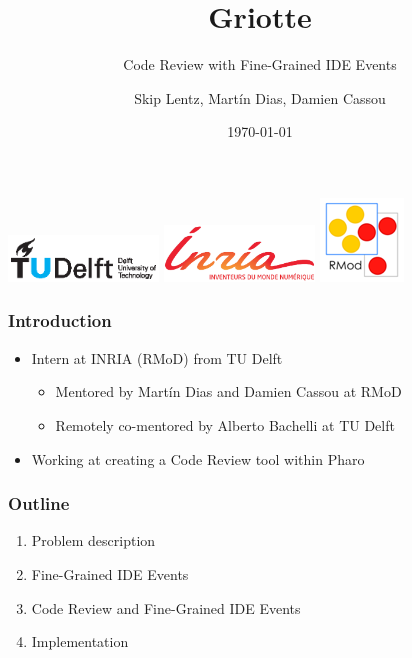 \documentclass[aspectratio=169]{beamer}
\title{Griotte}
\subtitle{Code Review with Fine-Grained IDE Events}
\author{Skip Lentz, Martín Dias, Damien Cassou}
\institute{TU Delft, INRIA Lille - Nord Europe}
\date{\today}
\begin{document}
\begin{frame}

\titlepage
\centering
\includegraphics[width=40mm]{img/tu_delft_logo.eps}
\includegraphics[width=40mm]{img/inria_logo.eps}
\includegraphics{img/rmod_logo.png}

\end{frame}

\begin{frame}[fragile]

\frametitle{Introduction}

\begin{itemize}
\item Intern at INRIA (RMoD) from TU Delft
\begin{itemize}
\item Mentored by Martín Dias and Damien Cassou at RMoD
\item Remotely co-mentored by Alberto Bachelli at TU Delft
\end{itemize}

\item Working at creating a Code Review tool within Pharo
\end{itemize}
\end{frame}

\begin{frame}[fragile]

\frametitle{Outline}

\begin{enumerate}
\item Problem description
\item Fine-Grained IDE Events
\item Code Review and Fine-Grained IDE Events
\item Implementation
\end{enumerate}
\end{frame}
\end{document}
